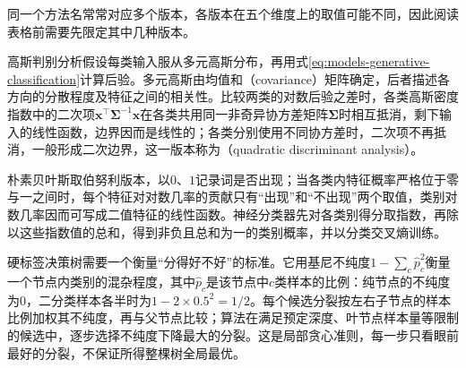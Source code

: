 同一个方法名常常对应多个版本，各版本在五个维度上的取值可能不同，因此阅读表格前需要先限定其中几种版本。

高斯判别分析假设每类输入服从多元高斯分布，再用式\eqref{eq:models-generative-classification}计算后验。多元高斯由均值和（covariance）矩阵确定，后者描述各方向的分散程度及特征之间的相关性。比较两类的对数后验之差时，各类高斯密度指数中的二次项$\bm{x}^{\top}\bm{\Sigma}^{-1}\bm{x}$在各类共用同一非奇异协方差矩阵$\bm{\Sigma}$时相互抵消，剩下输入的线性函数，边界因而是线性的；各类分别使用不同协方差时，二次项不再抵消，一般形成二次边界，这一版本称为（quadratic discriminant analysis）。

朴素贝叶斯取伯努利版本，以$0$、$1$记录词是否出现；当各类内特征概率严格位于零与一之间时，每个特征对对数几率的贡献只有“出现”和“不出现”两个取值，类别对数几率因而可写成二值特征的线性函数。神经分类器先对各类别得分取指数，再除以这些指数值的总和，得到非负且总和为一的类别概率，并以分类交叉熵训练。

硬标签决策树需要一个衡量“分得好不好”的标准。它用基尼不纯度$1-\sum_c\hat p_c^2$衡量一个节点内类别的混杂程度，其中$\hat p_c$是该节点中$c$类样本的比例：纯节点的不纯度为$0$，二分类样本各半时为$1-2\times0.5^2=1/2$。每个候选分裂按左右子节点的样本比例加权其不纯度，再与父节点比较；算法在满足预定深度、叶节点样本量等限制的候选中，逐步选择不纯度下降最大的分裂。这是局部贪心准则，每一步只看眼前最好的分裂，不保证所得整棵树全局最优。

